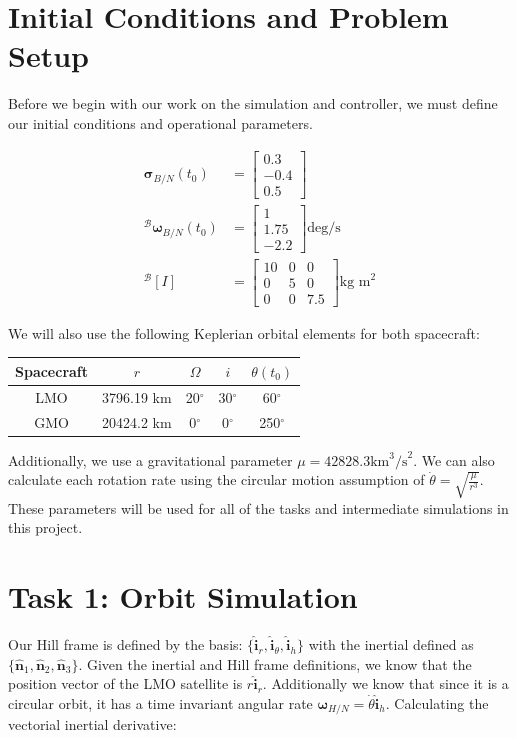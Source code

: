 \documentclass[paper]{aiaaNew}
\begin{document}
\section*{Initial Conditions and Problem Setup}
Before we begin with our work on the simulation and controller, we must define our initial conditions and operational parameters.

\begin{align}
  \bm{\sigma}_{B/N}(t_0) &= \begin{bmatrix} 0.3 \\ -0.4 \\ 0.5 \end{bmatrix} \\
  ^\mathcal{B}\bm{\omega}_{B/N}(t_0) &= \begin{bmatrix} 1 \\ 1.75 \\ -2.2 \end{bmatrix} \text{deg/s} \\
  ^\mathcal{B}[I] &= 
  \begin{bmatrix}
  10 & 0 & 0 \\
  0 & 5 & 0 \\
  0 & 0 & 7.5
  \end{bmatrix} \text{kg m}^2
\end{align}

We will also use the following Keplerian orbital elements for both spacecraft:

\begin{center}
 \begin{tabular}{||c c c c c||} 
 \hline
 Spacecraft & $r$ & $\Omega$ & $i$ & $\theta(t_0)$\\ [0.5ex] 
 \hline\hline
 LMO & 3796.19 km & 20$^\circ$ & 30$^\circ$ & 60$^\circ$ \\ 
 \hline
 GMO & 20424.2 km & 0$^\circ$ & 0$^\circ$ & 250$^\circ$ \\
 \hline
\end{tabular}
\end{center}

Additionally, we use a gravitational parameter $\mu = 42828.3 \text{km}^3 \text{/s}^2$. We can also calculate each rotation rate using the circular motion assumption of $\dot{\theta} = \sqrt { \frac{\mu}{r^3}}$. These parameters will be used for all of the tasks and intermediate simulations in this project.



\section*{Task 1: Orbit Simulation}
Our Hill frame is defined by the basis: $\{\bm{\hat{i}}_r, \bm{\hat{i}}_\theta, \bm{\hat{i}}_h \}$ with the inertial defined as $\{\bm{\hat{n}}_1, \bm{\hat{n}}_2, \bm{\hat{n}}_3 \}$. Given the inertial and Hill frame definitions, we know that the position vector of the LMO satellite is $r\bm{\hat{i}}_r$. Additionally we know that since it is a circular orbit, it has a time invariant angular rate ${\bm{\omega}}_{H/N} = \dot{\theta}\mathbf{\hat{i}}_h$. Calculating the vectorial inertial derivative:
\end{document}
